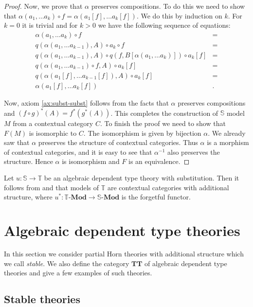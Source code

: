 \documentclass[reqno]{amsart}
\theoremstyle{definition}
\theoremstyle{remark}
\newcommand{\cat}[1]{\mathbf{#1}}
\newcommand{\algtt}{\cat{TT}}
\newcommand{\substTh}{\mathbb{S}}
\newcommand{\Mod}[1]{#1\text{-}\cat{Mod}}
\numberwithin{figure}{section}
\begin{document}
\begin{proof}
Now, we prove that $\alpha$ preserves compositions.
To do this we need to show that $\alpha(a_1, \ldots a_k) \circ f = \alpha(a_1[f], \ldots a_k[f])$.
We do this by induction on $k$.
For $k = 0$ it is trivial and for $k > 0$ we have the following sequence of equations:
\begin{align*}
\alpha(a_1, \ldots a_k) \circ f & = \\
q(\alpha(a_1, \ldots a_{k-1}), A) \circ a_k \circ f & = \\
q(\alpha(a_1, \ldots a_{k-1}), A) \circ q(f, B[\alpha(a_1, \ldots a_k)]) \circ a_k[f] & = \\
q(\alpha(a_1, \ldots a_{k-1}) \circ f, A) \circ a_k[f] & = \\
q(\alpha(a_1[f], \ldots a_{k-1}[f]), A) \circ a_k[f] & = \\
\alpha(a_1[f], \ldots a_k[f]) & .
\end{align*}

Now, axiom \eqref{ax:subst-subst} follows from the facts that $\alpha$ preserves compositions and $(f \circ g)^*(A) = f^*(g^*(A))$.
This completes the construction of $\substTh$ model $M$ from a contextual category $C$.
To finish the proof we need to show that $F(M)$ is isomorphic to $C$.
The isomorphism is given by bijection $\alpha$.
We already saw that $\alpha$ preserves the structure of contextual categories.
Thus $\alpha$ is a morphism of contextual categories, and it is easy to see that $\alpha^{-1}$ also preserves the structure.
Hence $\alpha$ is isomorphism and $F$ is an equivalence.
\end{proof}

Let $u : \substTh \to \mathbb{T}$ be an algebraic dependent type theory with substitution.
Then it follows from  and  that models of $\mathbb{T}$ are contextual categories with additional structure,
    where $u^* : \Mod{\mathbb{T}} \to \Mod{\substTh}$ is the forgetful functor.

\section{Algebraic dependent type theories}

In this section we consider partial Horn theories with additional structure which we call \emph{stable}.
We also define the category $\algtt$ of algebraic dependent type theories and give a few examples of such theories.

\subsection{Stable theories}
\end{document}
